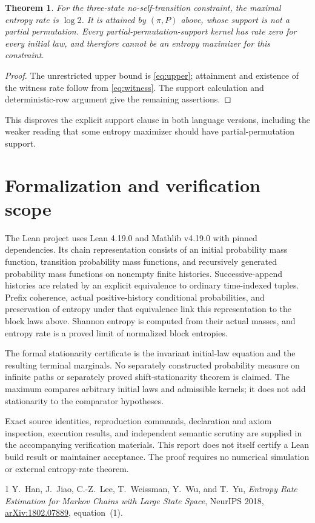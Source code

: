 \documentclass[10pt]{article}
\newtheorem{theorem}{Theorem}
\begin{document}
\begin{theorem}
For the three-state no-self-transition constraint, the maximal entropy rate is $\log2$. It is attained by $(\pi,P)$ above, whose support is not a partial permutation. Every partial-permutation-support kernel has rate zero for every initial law, and therefore cannot be an entropy maximizer for this constraint.
\end{theorem}
\begin{proof}
The unrestricted upper bound is \eqref{eq:upper}; attainment and existence of the witness rate follow from \eqref{eq:witness}. The support calculation and deterministic-row argument give the remaining assertions.
\end{proof}
This disproves the explicit support clause in both language versions, including the weaker reading that some entropy maximizer should have partial-permutation support.

\section{Formalization and verification scope}
The Lean project uses Lean 4.19.0 and Mathlib v4.19.0 with pinned dependencies. Its chain representation consists of an initial probability mass function, transition probability mass functions, and recursively generated probability mass functions on nonempty finite histories. Successive-append histories are related by an explicit equivalence to ordinary time-indexed tuples. Prefix coherence, actual positive-history conditional probabilities, and preservation of entropy under that equivalence link this representation to the block laws above. Shannon entropy is computed from their actual masses, and entropy rate is a proved limit of normalized block entropies.

The formal stationarity certificate is the invariant initial-law equation and the resulting terminal marginals. No separately constructed probability measure on infinite paths or separately proved shift-stationarity theorem is claimed. The maximum compares arbitrary initial laws and admissible kernels; it does not add stationarity to the comparator hypotheses.

Exact source identities, reproduction commands, declaration and axiom inspection, execution results, and independent semantic scrutiny are supplied in the accompanying verification materials. This report does not itself certify a Lean build result or maintainer acceptance. The proof requires no numerical simulation or external entropy-rate theorem.

\begin{thebibliography}{1}
Y.~Han, J.~Jiao, C.-Z.~Lee, T.~Weissman, Y.~Wu, and T.~Yu,
\emph{Entropy Rate Estimation for Markov Chains with Large State Space},
NeurIPS 2018, \href{https://arxiv.org/abs/1802.07889}{arXiv:1802.07889}, equation~(1).
\end{thebibliography}
\end{document}
